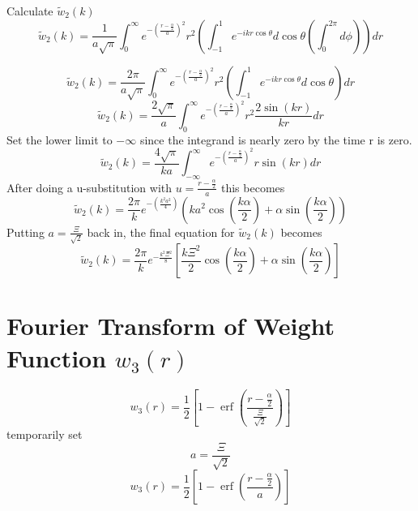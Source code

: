 \documentclass[double,12pt]{beavtex}
\begin{document}
\noindent Calculate $\widetilde{w}_2(k)$ 
\begin{equation}{\widetilde{w}_2(k)=\frac{1}{a\sqrt{\pi}}\int_{0}^{\infty}e^{-\left(\frac{r-\frac{\alpha}{2}}{a}\right)^2}r^2\left(\int_{-1}^{1}e^{-ikr\cos\theta}d{\cos\theta}\left(\int_{0}^{2\pi}d{\phi}\right)\right)d{r}}\end{equation}

\begin{equation}{\widetilde{w}_2(k)=\frac{2\pi}{a\sqrt{\pi}}\int_{0}^{\infty}e^{-\left(\frac{r-\frac{\alpha}{2}}{a}\right)^2}r^2\left(\int_{-1}^{1}e^{-ikr\cos\theta}d{\cos\theta}\right)d{r}}\end{equation}
\begin{equation}{\widetilde{w}_2(k)=\frac{2\sqrt{\pi}}{a}\int_{0}^{\infty}e^{-\left(\frac{r-\frac{\alpha}{2}}{a}\right)^2}r^2\frac{2\sin(kr)}{kr}d{r}}\end{equation}
Set the lower limit to $-\infty$  since the integrand is nearly zero by the time r is zero.
\begin{equation}{\widetilde{w}_2(k)=\frac{4\sqrt{\pi}}{ka}\int_{-\infty}^{\infty}e^{-\left(\frac{r-\frac{\alpha}{2}}{a}\right)^2}r\sin(kr)d{r}}\end{equation}
After doing a u-substitution with $u=\frac{r-\frac{\alpha}{2}}{a}$ this becomes
\begin{equation}{\widetilde{w}_2(k)=\frac{2\pi}{k}e^{-\left(\frac{k^2a^2}{4}\right)}\left(ka^2\cos\left(\frac{k\alpha}{2}\right)+\alpha\sin\left(\frac{k\alpha}{2}\right)\right)}\end{equation}
Putting $a=\frac{\Xi}{\sqrt{2}}$ back in, the final equation for $\widetilde{w}_2(k)$ becomes
\begin{equation}{\widetilde{w}_2(k)=\frac{2\pi}{k}e^{-\frac{k^2\Xi^2}{8}}\left[\frac{k\Xi^2}{2}\cos\left(\frac{k\alpha}{2}\right)+\alpha\sin\left(\frac{k\alpha}{2}\right)\right]}\end{equation}

\section{Fourier Transform of Weight Function $w_{3}(r)$}
\begin{equation}{w_3(r)=\frac{1}{2}\left[1-\operatorname{erf}\left(\frac{r-\frac{\alpha}{2}}{\frac{\Xi}{\sqrt{2}}}\right)\right]}\end{equation}
temporarily set 
\begin{equation}{a=\frac{\Xi}{\sqrt{2}}}\end{equation}
\begin{equation}{w_3(r)=\frac{1}{2}\left[1-\operatorname{erf}\left(\frac{r-\frac{\alpha}{2}}{a}\right)\right]}\end{equation}
\end{document}
